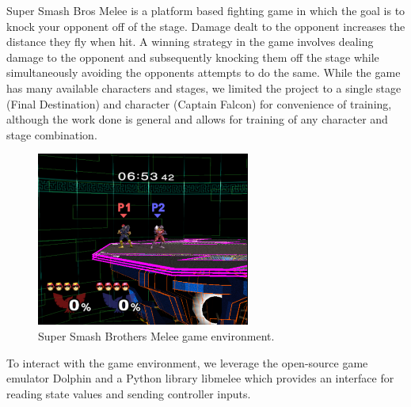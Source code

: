 Super Smash Bros Melee is a platform based fighting game in which the goal is to knock your opponent off of the stage. Damage dealt to the opponent increases the distance they fly when hit. A winning strategy in the game involves dealing damage to the opponent and subsequently knocking them off the stage while simultaneously avoiding the opponents attempts to do the same. While the game has many available characters and stages, we limited the project to a single stage (Final Destination) and character (Captain Falcon) for convenience of training, although the work done is general and allows for training of any character and stage combination.

\begin{figure}[!htb]
\centering
	\includegraphics[width=70mm]{stage.png}
	\caption{Super Smash Brothers Melee game environment. \label{melee}}
\end{figure}

To interact with the game environment, we leverage the open-source game emulator Dolphin and a Python library libmelee which provides an interface for reading state values and sending controller inputs. 







